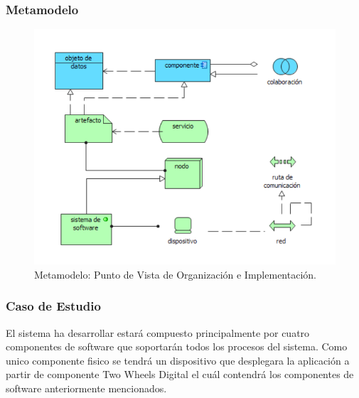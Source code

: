 \subsubsection{Metamodelo}
\begin{figure}[H]
	\centering
	\includegraphics[width=1.0\textwidth]{imagenes/Metamodelos/Tecnologia/meta_organizacion_implementacion.PDF}
	\caption{Metamodelo: Punto de Vista de Organización e Implementación.}
	\label{fig:gap_analysis}
\end{figure}

\subsubsection{Caso de Estudio}
El sistema ha desarrollar estará compuesto principalmente por cuatro componentes de software que soportarán todos los procesos del sistema. Como unico componente fisico se tendrá un dispositivo que desplegara la aplicación a partir de componente Two Wheels Digital el cuál contendrá los componentes de software anteriormente mencionados.

